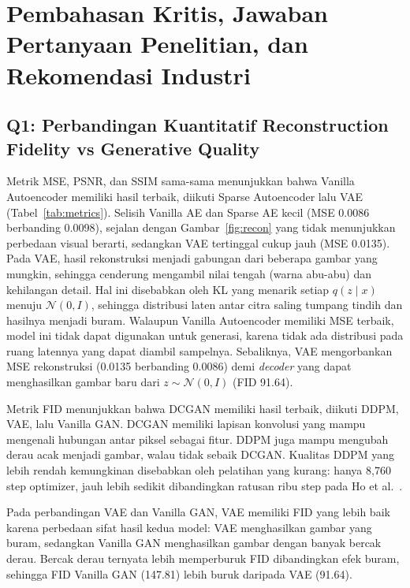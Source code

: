 \documentclass{article}
\begin{document}
\section{Pembahasan Kritis, Jawaban Pertanyaan Penelitian, dan Rekomendasi Industri}

\subsection{Q1: Perbandingan Kuantitatif Reconstruction Fidelity vs Generative Quality}
Metrik MSE, PSNR, dan SSIM sama-sama menunjukkan bahwa Vanilla Autoencoder memiliki hasil terbaik, diikuti Sparse Autoencoder lalu VAE (Tabel~\ref{tab:metrics}). Selisih Vanilla AE dan Sparse AE kecil (MSE 0.0086 berbanding 0.0098), sejalan dengan Gambar~\ref{fig:recon} yang tidak menunjukkan perbedaan visual berarti, sedangkan VAE tertinggal cukup jauh (MSE 0.0135). Pada VAE, hasil rekonstruksi menjadi gabungan dari beberapa gambar yang mungkin, sehingga cenderung mengambil nilai tengah (warna abu-abu) dan kehilangan detail. Hal ini disebabkan oleh KL yang menarik setiap $q(z \mid x)$ menuju $\mathcal{N}(0, I)$, sehingga distribusi laten antar citra saling tumpang tindih dan hasilnya menjadi buram. Walaupun Vanilla Autoencoder memiliki MSE terbaik, model ini tidak dapat digunakan untuk generasi, karena tidak ada distribusi pada ruang latennya yang dapat diambil sampelnya. Sebaliknya, VAE mengorbankan MSE rekonstruksi (0.0135 berbanding 0.0086) demi \textit{decoder} yang dapat menghasilkan gambar baru dari $z \sim \mathcal{N}(0, I)$ (FID 91.64).

Metrik FID menunjukkan bahwa DCGAN memiliki hasil terbaik, diikuti DDPM, VAE, lalu Vanilla GAN. DCGAN memiliki lapisan konvolusi yang mampu mengenali hubungan antar piksel sebagai fitur. DDPM juga mampu mengubah derau acak menjadi gambar, walau tidak sebaik DCGAN. Kualitas DDPM yang lebih rendah kemungkinan disebabkan oleh pelatihan yang kurang: hanya 8,760 step optimizer, jauh lebih sedikit dibandingkan ratusan ribu step pada Ho et al.~\cite{ho2020}.

Pada perbandingan VAE dan Vanilla GAN, VAE memiliki FID yang lebih baik karena perbedaan sifat hasil kedua model: VAE menghasilkan gambar yang buram, sedangkan Vanilla GAN menghasilkan gambar dengan banyak bercak derau. Bercak derau ternyata lebih memperburuk FID dibandingkan efek buram, sehingga FID Vanilla GAN (147.81) lebih buruk daripada VAE (91.64).
\end{document}
